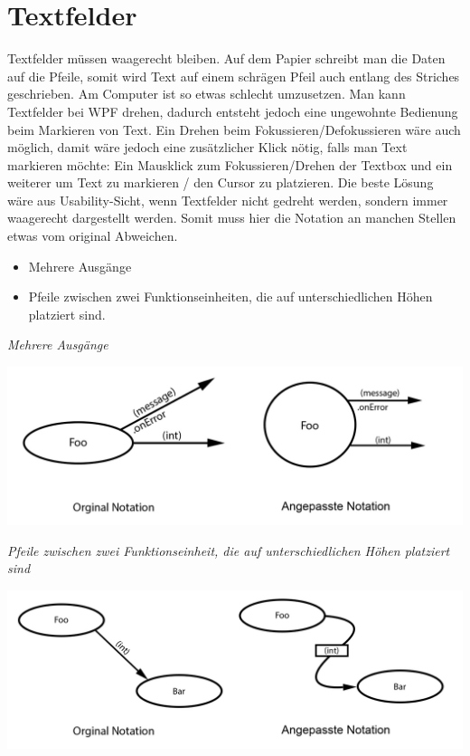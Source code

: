 \section{Textfelder}

Textfelder müssen waagerecht bleiben. Auf dem Papier schreibt man die Daten auf
die Pfeile, somit wird Text auf einem schrägen Pfeil auch entlang des Striches
geschrieben.
Am Computer ist so etwas schlecht umzusetzen. Man kann Textfelder bei WPF drehen, dadurch
entsteht jedoch eine ungewohnte Bedienung beim Markieren von Text. Ein Drehen
beim Fokussieren/Defokussieren wäre auch möglich, damit wäre jedoch eine zusätzlicher
Klick nötig, falls man Text markieren möchte: Ein Mausklick zum Fokussieren/Drehen
der Textbox und ein weiterer um Text zu markieren / den Cursor zu platzieren.
Die beste Lösung wäre aus Usability-Sicht, wenn Textfelder nicht gedreht werden,
sondern immer waagerecht dargestellt werden. Somit muss hier die Notation an
manchen Stellen etwas vom original Abweichen.
\begin{itemize}
\item Mehrere Ausgänge
\item Pfeile zwischen zwei Funktionseinheiten, die auf unterschiedlichen Höhen platziert
sind.
\end{itemize}

\emph{Mehrere Ausgänge}



\includegraphics[width=.9\linewidth]{./img/NotationChanges1.jpg}
\bigskip

\emph{
Pfeile zwischen zwei Funktionseinheit, die auf unterschiedlichen Höhen platziert
sind}

\includegraphics[width=.9\linewidth]{./img/NotationChanges2.jpg}



